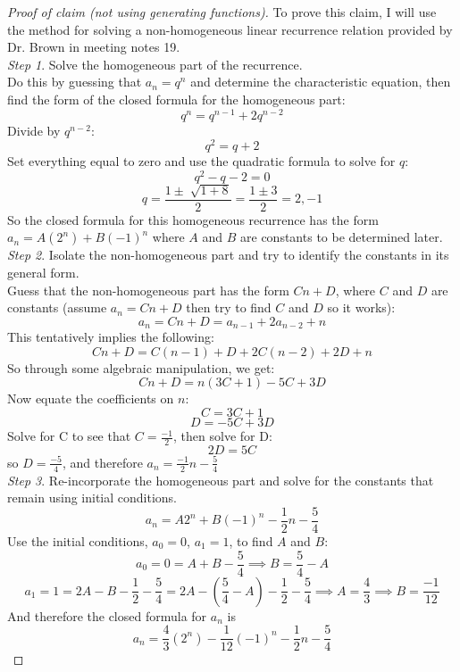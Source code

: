 \documentclass[12pt]{article}
\begin{document}
\begin{proof}[Proof of claim (not using generating functions)]
To prove this claim, I will use the method for solving a non-homogeneous linear recurrence relation provided by Dr. Brown in meeting notes 19. \\
\textit{Step 1}. Solve the homogeneous part of the recurrence. \\
Do this by guessing that $a_n=q^n$ and determine the characteristic equation, then find the form of the closed formula for the homogeneous part:
\[q^n =q^{n-1}+2q^{n-2}\]
Divide by $q^{n-2}$:
\[q^2 = q + 2\] 
Set everything equal to zero and use the quadratic formula to solve for $q$:
\[q^2 - q - 2 =0\]
\[q = \frac{1 \pm \sqrt[]{1+8}}{2} = \frac{1 \pm 3}{2} = 2, -1\]
So the closed formula for this homogeneous recurrence has the form $a_n=A(2^n)+B(-1)^n$ where $A$ and $B$ are constants to be determined later.\\
\textit{Step 2}. Isolate the non-homogeneous part and try to identify the constants in its general form. \\
Guess that the non-homogeneous part has the form $Cn+D$, where $C$ and $D$ are constants (assume $a_n=Cn+D$ then try to find $C$ and $D$ so it works):
\[a_n=Cn+D=a_{n-1}+2a_{n-2}+n\]
This tentatively implies the following:
\[Cn+D=C(n-1)+D+2C(n-2)+2D+n\]
So through some algebraic manipulation, we get:
\[Cn+D=n(3C+1)-5C+3D\]
Now equate the coefficients on $n$:
\[C=3C+1\]
\[D=-5C+3D\]
Solve for C to see that $C=\frac{-1}{2}$, then solve for D:
\[2D=5C\]
so $D=\frac{-5}{4}$, and therefore $a_n=\frac{-1}{2}n-\frac{5}{4}$ \\
\textit{Step 3}. Re-incorporate the homogeneous part and solve for the constants that remain using initial conditions.
\[a_n=A2^n+B(-1)^n-\frac{1}{2}n-\frac{5}{4}\]
Use the initial conditions, $a_0=0$, $a_1=1$, to find $A$ and $B$:
\[a_0 = 0 = A+B-\frac{5}{4} \implies B=\frac{5}{4}-A\]
\[a_1=1=2A-B-\frac{1}{2}-\frac{5}{4} = 2A-(\frac{5}{4}-A)-\frac{1}{2}-\frac{5}{4} \implies A=\frac{4}{3} \implies B=\frac{-1}{12}\]
And therefore the closed formula for $a_n$ is
\[a_n=\frac{4}{3}(2^n)-\frac{1}{12}(-1)^n-\frac{1}{2}n-\frac{5}{4}\]
\end{proof}
\end{document}
